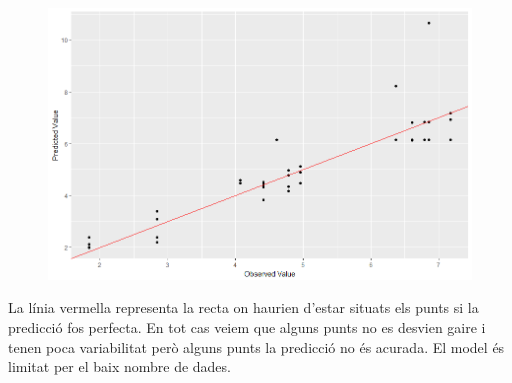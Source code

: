 \documentclass[a4paper]{article}
\begin{document}
\begin{figure}[H]
	\centering
	\includegraphics[scale=0.45]{plot}
\end{figure}

La línia vermella representa la recta on haurien d'estar situats els punts si la predicció fos perfecta. En tot cas veiem que alguns punts no es desvien gaire i tenen poca variabilitat però alguns punts la predicció no és acurada. El model és limitat per el baix nombre de dades.
\end{document}
